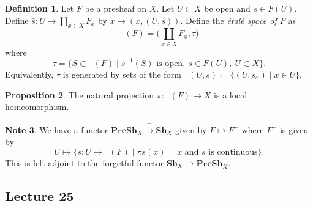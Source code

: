\documentclass[10pt,letterpaper,cm]{nupset}
\theoremstyle{definition}
\newtheorem{definition}{Definition}[subsection]
\newtheorem{note}[definition]{Note}
\theoremstyle{theorem}
\newtheorem{prop}[definition]{Proposition}
\theoremstyle{remark}
\newcommand{\1}{\mathbb{1}}
\newcommand{\0}{\vec 0}
\DeclareMathOperator{\Et}{\acute{E}t}
\begin{document}
\begin{definition}
Let $F$ be a presheaf on $X$. Let $U \subset X$ be open and $s \in F(U)$. Define $\bar{s} : U \to  \coprod_{x\in X} F_x$ by $x \mapsto (x, (U, s))$. Define the \textit{\'etal\'e space of $F$} as $$\Et(F)   =  \big (\coprod_{x\in X} F_x, \tau \big )$$ where $$\tau =\{S \subset \Et(F) \mid \bar{s}^{-1}(S) \text{ is open}, \ s \in F(U), \ U\subset X \}.    $$ Equivalently, $\tau$ is generated by sets of the form $\Et(U, s) \coloneqq  \{(U, s_x) \mid x \in U\}$.
\end{definition}

\begin{prop}
The natural projection $\pi : \Et(F) \to X$ is a local homeomorphism. 
\end{prop}

\begin{note}
We have a functor $\mathbf{PreSh}_X \overset{+}{\longrightarrow} \mathbf{Sh}_{X}$ given by $F \mapsto F^{+}$ where $F^{+}$ is given by $$U \mapsto \{s : U \to \Et(F) \mid \pi s(x) = x \text{ and } s \text{ is continuous}\}  .$$ This is left adjoint to the forgetful functor $\mathbf{Sh}_{X} \to \mathbf{PreSh}_X$.
\end{note}

\subsection{Lecture 25}
\end{document}
